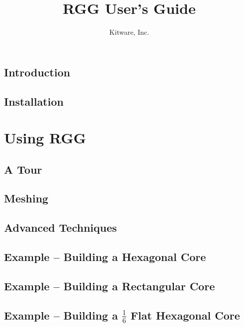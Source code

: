 \documentclass[letterpaper,10pt,draft]{book}
\title{RGG User's Guide}
\author{Kitware, Inc.}
\begin{document}
\maketitle
\tableofcontents

\chapter{Introduction}
\label{chapter:Introduction}


\chapter{Installation}
\label{Installation}


\part{Using RGG}

\chapter{A Tour}
\label{chapter:ATour}



\chapter{Meshing}
\label{chapter:Meshing}




\chapter{Advanced Techniques}
\label{chapter:AdvancedTechniques}

\chapter{Example -- Building a Hexagonal Core}
\label{chapter:ExampleBuildingAHexagonalCore}


\chapter{Example -- Building a Rectangular Core}
\label{chapter:ExampleBuildingARectangularCore}


\chapter{Example -- Building a $\frac{1}{6}$ Flat Hexagonal Core}
\label{chapter:ExampleBuildingA6thFlatHexagonalCore}
\end{document}
